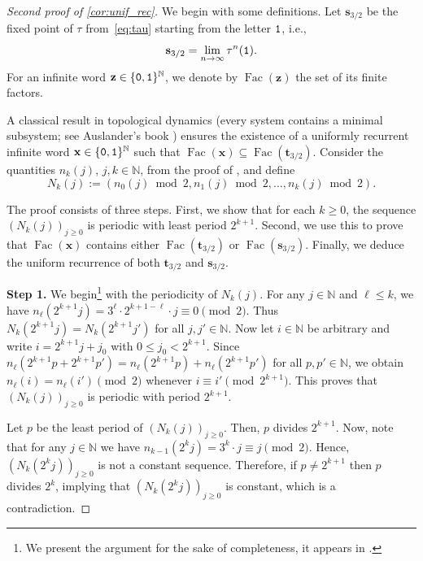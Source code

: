 \documentclass[12pt,reqno]{article}
\DeclareMathOperator{\cL}{\mathrm{Fac}}
\newcommand{\N}{\mathbb{N}}
\begin{document}
\begin{proof}[Second proof of \cref{cor:unif_rec}]
We begin with some definitions.
Let $\mathbf{s}_{3/2}$ be the fixed point of $\tau$ from~\cref{eq:tau} starting from the letter ${\tt 1}$,  i.e.,  
\[ 
\mathbf{s}_{3/2} =
\lim_{n\to\infty} \tau^n({\tt 1}).
\]
For an infinite word $\mathbf{z} \in \{{\tt0},{\tt1}\}^\N$, we denote by $\cL(\mathbf{z})$ the set of its finite factors.

A classical result in topological dynamics (every system contains a minimal subsystem; see Auslander's book \cite{auslander}) ensures the existence of a uniformly recurrent infinite word $\mathbf{x} \in \{{\tt0},{\tt1}\}^\N$ such that
$\cL(\mathbf{x}) \subseteq \cL(\mathbf{t}_{3/2})$.
Consider the quantities $n_k(j)$, $j,k \in \N$, from the proof of , and define
\[
N_k(j) := (n_0(j) \bmod 2, n_1(j) \bmod 2, \dots, n_k(j) \bmod 2).
\]

The proof consists of three steps.
First, we show that for each $k \ge 0$, the sequence $(N_k(j))_{j\ge 0}$ is periodic with least period $2^{k+1}$.
Second, we use this to prove that $\cL(\mathbf{x})$ contains either $\cL(\mathbf{t}_{3/2})$ or $\cL(\mathbf{s}_{3/2})$.
Finally, we deduce the uniform recurrence of both $\mathbf{t}_{3/2}$ and $\mathbf{s}_{3/2}$.

\textbf{Step 1.} We begin\footnote{We present the argument for the sake of completeness, it appears in \cite[Lem.~4.14]{Marsault}.} with the periodicity of $N_k(j)$.
For any $j \in \N$ and $\ell \le k$, we have
$n_\ell(2^{k+1} j) = 3^\ell\cdot 2^{k+1-\ell}\cdot j \equiv 0 \pmod 2$.
Thus $N_k(2^{k+1} j) = N_k(2^{k+1} j')$ for all $j,j' \in \N$.
Now let $i \in \N$ be arbitrary and write $i = 2^{k+1} j + j_0$ with $0 \le j_0 < 2^{k+1}$.
Since
$n_\ell(2^{k+1}p + 2^{k+1}p') = n_\ell(2^{k+1}p) + n_\ell(2^{k+1}p')$
for all $p,p' \in \N$, we obtain
$n_\ell(i) = n_\ell(i') \pmod 2$
whenever $i \equiv i' \pmod{2^{k+1}}$.
This proves that $(N_k(j))_{j\ge 0}$ is periodic with period $2^{k+1}$.

Let $p$ be the least period of $(N_k(j))_{j\ge 0}$.
Then, $p$ divides $2^{k+1}$.
Now, note that for any $j \in \N$ we have $n_{k-1}(2^k j) = 3^k\cdot j \equiv j \pmod 2$.
Hence, $(N_k(2^k j))_{j\ge 0}$ is not a constant sequence.
Therefore, if $p \neq 2^{k+1}$ then $p$ divides $2^k$, implying that $(N_k(2^k j))_{j\ge 0}$ is constant, which is a contradiction.


\end{proof}
\end{document}
